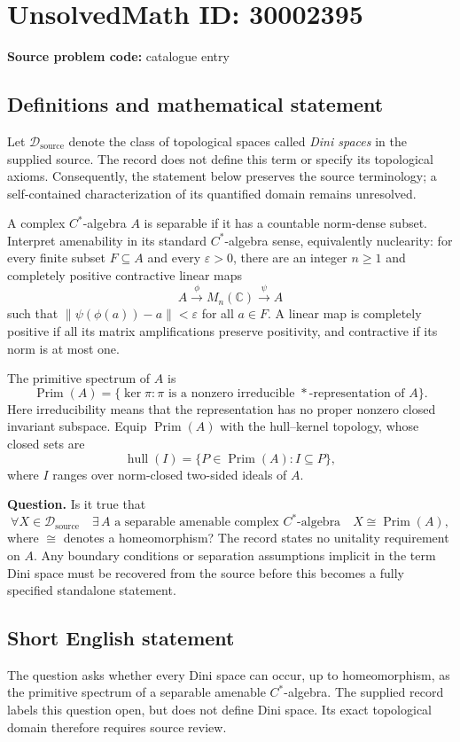 \documentclass[11pt]{article}
\newcommand{\C}{\mathbb{C}}
\begin{document}
\section*{UnsolvedMath ID: 30002395}
\textbf{Source problem code:} catalogue entry
\subsection{Definitions and mathematical statement}
Let \(\mathcal D_{\mathrm{source}}\) denote the class of topological spaces called \emph{Dini spaces} in the supplied source. The record does not define this term or specify its topological axioms. Consequently, the statement below preserves the source terminology; a self-contained characterization of its quantified domain remains unresolved.

A complex \(C^*\)-algebra \(A\) is separable if it has a countable norm-dense subset. Interpret amenability in its standard \(C^*\)-algebra sense, equivalently nuclearity: for every finite subset \(F\subseteq A\) and every \(\varepsilon>0\), there are an integer \(n\geq 1\) and completely positive contractive linear maps
\[
A\xrightarrow{\phi}M_n(\C)\xrightarrow{\psi}A
\]
such that \(\|\psi(\phi(a))-a\|<\varepsilon\) for all \(a\in F\). A linear map is completely positive if all its matrix amplifications preserve positivity, and contractive if its norm is at most one.

The primitive spectrum of \(A\) is
\[
\operatorname{Prim}(A)=\{\ker\pi:\pi\text{ is a nonzero irreducible }*\text{-representation of }A\}.
\]
Here irreducibility means that the representation has no proper nonzero closed invariant subspace. Equip \(\operatorname{Prim}(A)\) with the hull--kernel topology, whose closed sets are
\[
\operatorname{hull}(I)=\{P\in\operatorname{Prim}(A):I\subseteq P\},
\]
where \(I\) ranges over norm-closed two-sided ideals of \(A\).

\textbf{Question.} Is it true that
\[
\forall X\in\mathcal D_{\mathrm{source}}\quad
\exists\, A\text{ a separable amenable complex }C^*\text{-algebra}\quad
X\cong\operatorname{Prim}(A),
\]
where \(\cong\) denotes a homeomorphism? The record states no unitality requirement on \(A\). Any boundary conditions or separation assumptions implicit in the term Dini space must be recovered from the source before this becomes a fully specified standalone statement.
\subsection{Short English statement}
The question asks whether every Dini space can occur, up to homeomorphism, as the primitive spectrum of a separable amenable \(C^*\)-algebra. The supplied record labels this question open, but does not define Dini space. Its exact topological domain therefore requires source review.
\end{document}
